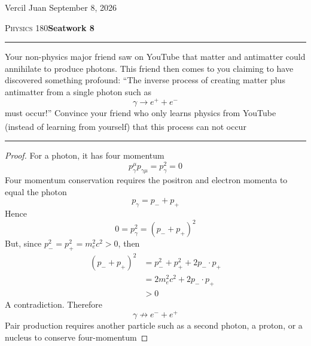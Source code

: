\documentclass[8pt, a6paper]{article}
\begin{document}
{\footnotesize
	\noindent Vercil Juan \hfill September 8, 2026

	\noindent \textsc{Physics 180}\hfill \textbf{Seatwork 8}
	\vspace{1em}
	\hrule\vspace{5pt}
		Your non-physics major friend saw on YouTube that matter and 
		antimatter could annihilate to produce photons. This friend then comes 
		to you claiming to have discovered something profound: “The inverse 
		process of creating matter plus antimatter from a single photon such as
		\begin{equation}
			\label{eq:gammatoe}
		    \gamma \to e^+ + e^-
		\end{equation}
		must occur!” Convince your friend who only learns physics from 
		YouTube (instead of learning from yourself\textsuperscript{\texttrademark}) that this process can not 
		occur
		\vspace{5pt}
	\hrule
	\begin{proof}
		For a photon, it has four momentum
		\begin{equation}
			\label{eq:photon}
			p_\gamma^\mu p_{\gamma \mu} = p_\gamma^2 = 0
		\end{equation}
		Four momentum conservation requires the positron and electron momenta to equal the photon
		\[
			p_\gamma = p_- + p_+
		\]
		Hence
		\[
			0 = p_\gamma^2 = (p_- + p_+)^2
		\]
		But, since $p_-^2 = p_+^2 = m_e^2 c^2 > 0$, then
		\begin{align*}
			(p_- +p_+)^2 &= p_-^2 + p_+^2 + 2p_-\cdot p_+ \\
			             &= 2m_e^2 c^2 + 2p_- \cdot p_+\\
						 &>0
		\end{align*}
		A contradiction. Therefore
		\begin{equation}
			\label{eq:result}
		    \gamma \not\to e^- + e^+
		\end{equation}
		Pair production requires another particle such as a second photon,
		a proton, or a nucleus to conserve four-momentum
	\end{proof}
}
\end{document}
